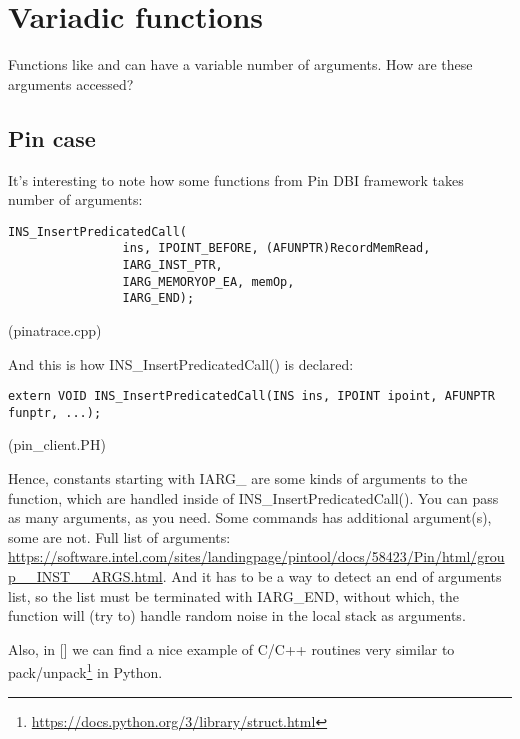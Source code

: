 \section{Variadic functions}

Functions like \printf and \scanf can have a variable number of arguments.
How are these arguments accessed?




\subsection{Pin case}

It's interesting to note how some functions from Pin \ac{DBI} framework takes number of arguments:

\begin{lstlisting}[style=customc]
            INS_InsertPredicatedCall(
                ins, IPOINT_BEFORE, (AFUNPTR)RecordMemRead,
                IARG_INST_PTR,
                IARG_MEMORYOP_EA, memOp,
                IARG_END);
\end{lstlisting}
(pinatrace.cpp)

And this is how INS\_InsertPredicatedCall() is declared:

\begin{lstlisting}[style=customc]
extern VOID INS_InsertPredicatedCall(INS ins, IPOINT ipoint, AFUNPTR funptr, ...);
\end{lstlisting}
(pin\_client.PH)

Hence, constants starting with IARG\_ are some kinds of arguments to the function,
which are handled inside of INS\_InsertPredicatedCall().
You can pass as many arguments, as you need.
Some commands has additional argument(s), some are not.
Full list of arguments:
\url{https://software.intel.com/sites/landingpage/pintool/docs/58423/Pin/html/group__INST__ARGS.html}.
And it has to be a way to detect an end of arguments list, so the list must be terminated with IARG\_END, without which,
the function will (try to) handle random noise in the local stack as arguments.

Also, in [\RobPikePractice] we can find a nice example of C/C++ routines very similar to
pack/unpack\footnote{\url{https://docs.python.org/3/library/struct.html}} in Python.



